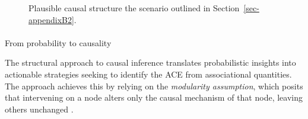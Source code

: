 \documentclass[
  authoryear,
  review,
  1p]{elsarticle}
\makeatletter
\let\oldparagraph\paragraph
\renewcommand{\paragraph}{
    \@ifstar
      \xxxParagraphStar
      \xxxParagraphNoStar
  }
\newcommand{\xxxParagraphStar}[1]{\oldparagraph*{#1}\mbox{}}
\newcommand{\xxxParagraphNoStar}[1]{\oldparagraph{#1}\mbox{}}
\makeatother
\begin{document}
\begin{figure}

\begin{minipage}{0.50\linewidth}

\centering{

\[
\begin{aligned}
  X & := x \\
  T & := f_{T}(x,e_{T}) \\
  Y & := f_{Y}(T,x,e_{Y}) \\
  e_{T} & \:\bot\:e_{X} \\
  e_{T} & \:\bot\:e_{Y} \\
  e_{X} & \:\bot\:e_{Y}
\end{aligned}
\]

}


\end{minipage}%
%
\begin{minipage}{0.50\linewidth}



\end{minipage}%

\caption{\label{fig-example2}Plausible causal structure the scenario
outlined in Section~\ref{sec-appendixB2}.}

\end{figure}%

\paragraph{From probability to causality}\label{sec-appendixB33}

The structural approach to causal inference translates probabilistic
insights into actionable strategies seeking to identify the ACE from
associational quantities. The approach achieves this by relying on the
\emph{modularity assumption}, which posits that intervening on a node
alters only the causal mechanism of that node, leaving others unchanged
\citep[p.~34]{Neal_2020}.
\end{document}
